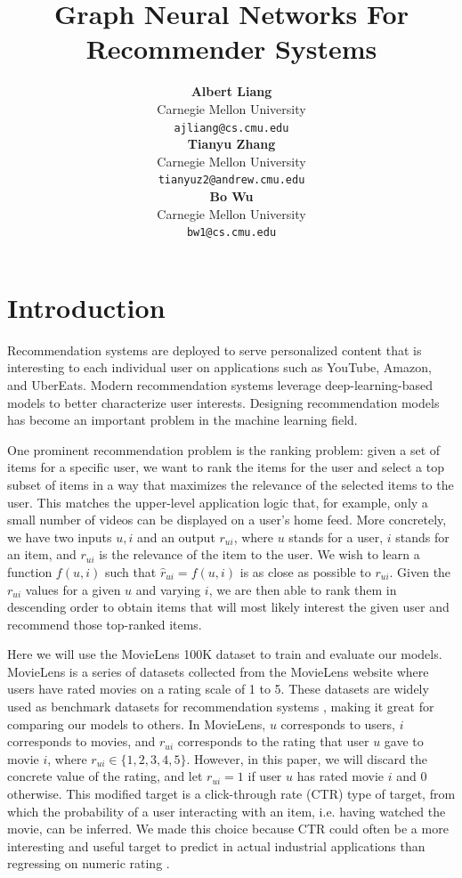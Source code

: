 \documentclass{article}
\title{Graph Neural Networks For Recommender Systems}
\author{
  \textbf{Albert Liang}  \\
  Carnegie Mellon University \\
  \texttt{ajliang@cs.cmu.edu} \\
  \And
  \textbf{Tianyu Zhang} \\
  Carnegie Mellon University \\
  \texttt{tianyuz2@andrew.cmu.edu} \\
  \And
  \textbf{Bo Wu} \\
  Carnegie Mellon University \\
  \texttt{bw1@cs.cmu.edu} \\
}
\begin{document}
\maketitle


\vspace{-.8cm}

\section{Introduction} \label{intro}


Recommendation systems are deployed to serve personalized content that is interesting to each individual user on applications such as YouTube, Amazon, and UberEats. Modern recommendation systems leverage deep-learning-based models to better characterize user interests. Designing recommendation models has become an important problem in the machine learning field.

One prominent recommendation problem is the ranking problem: given a set of items for a specific user, we want to rank the items for the user and select a top subset of items in a way that maximizes the relevance of the selected items to the user. This matches the upper-level application logic that, for example, only a small number of videos can be displayed on a user's home feed. More concretely, we have two inputs $u,i$ and an output $r_{ui}$, where $u$ stands for a user, $i$ stands for an item, and $r_{ui}$ is the relevance of the item to the user. We wish to learn a function $f(u,i)$ such that $\hat{r}_{ui}=f(u,i)$ is as close as possible to $r_{ui}$. Given the $r_{ui}$ values for a given $u$ and varying $i$, we are then able to rank them in descending order to obtain items that will most likely interest the given user and recommend those top-ranked items.

Here we will use the MovieLens 100K \cite{movielens} dataset to train and evaluate our models. MovieLens is a series of datasets collected from the MovieLens website where users have rated movies on a rating scale of 1 to 5. These datasets are widely used as benchmark datasets for recommendation systems \cite{DBLP:journals/corr/abs-2011-02260}, making it great for comparing our models to others. In MovieLens, $u$ corresponds to users, $i$ corresponds to movies, and $r_{ui}$ corresponds to the rating that user $u$ gave to movie $i$, where $r_{ui}\in\{1,2,3,4,5\}$. However, in this paper, we will discard the concrete value of the rating, and let $r_{ui}=1$ if user $u$ has rated movie $i$ and $0$ otherwise. This modified target is a click-through rate (CTR) type of target, from which the probability of a user interacting with an item, i.e. having watched the movie, can be inferred. We made this choice because CTR could often be a more interesting and useful target to predict in actual industrial applications than regressing on numeric rating \cite{ctr}.
\end{document}
